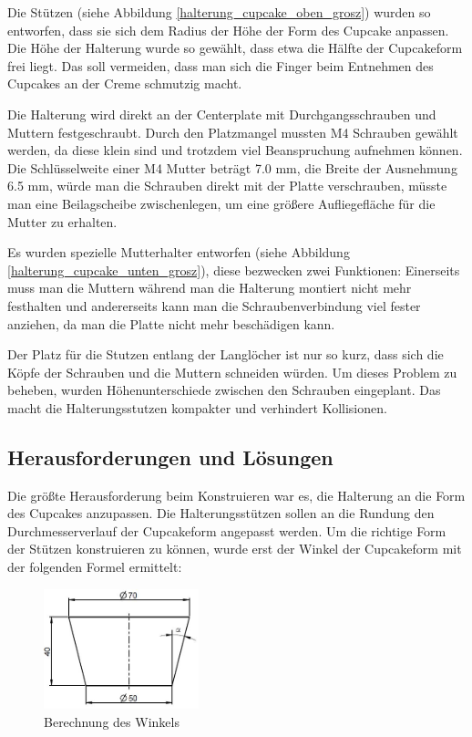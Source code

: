	Die Stützen (siehe Abbildung \ref{halterung_cupcake_oben_grosz}) wurden so entworfen, dass sie sich dem Radius \bzw der Höhe der Form des Cupcake anpassen.
	Die Höhe der Halterung wurde so gewählt, dass etwa die Hälfte der Cupcakeform frei liegt.
	Das soll vermeiden, dass man sich die Finger beim Entnehmen des Cupcakes an der Creme schmutzig macht.

	Die Halterung wird direkt an der Centerplate mit Durchgangsschrauben und Muttern festgeschraubt.
	Durch den Platzmangel mussten M4 Schrauben gewählt werden, da diese klein sind und trotzdem viel Beanspruchung aufnehmen können.
	Die Schlüsselweite einer M4 Mutter beträgt 7.0 mm, die Breite der Ausnehmung 6.5 mm, würde man die Schrauben direkt mit der Platte verschrauben, müsste man eine Beilagscheibe zwischenlegen, um eine größere Aufliegefläche für die Mutter zu erhalten.

	Es wurden spezielle Mutterhalter entworfen (siehe Abbildung \ref{halterung_cupcake_unten_grosz}), diese bezwecken zwei Funktionen:
	Einerseits muss man die Muttern während man die Halterung montiert nicht mehr festhalten und andererseits kann man die Schraubenverbindung viel fester anziehen, da man die Platte nicht mehr beschädigen kann.

	Der Platz für die Stutzen entlang der Langlöcher ist nur so kurz, dass sich die Köpfe der Schrauben und die Muttern schneiden würden.
	Um dieses Problem zu beheben, wurden Höhenunterschiede zwischen den Schrauben eingeplant.
	Das macht die Halterungsstutzen kompakter und verhindert Kollisionen.

		\newpage

	\subsection{Herausforderungen und Lösungen}

	Die größte Herausforderung beim Konstruieren war es, die Halterung an die Form des Cupcakes anzupassen.
	Die Halterungsstützen sollen an die Rundung \bzw den Durchmesserverlauf der Cupcakeform angepasst werden.
	Um die richtige Form der Stützen konstruieren zu können, wurde erst der Winkel der Cupcakeform mit der  folgenden Formel ermittelt:

			\begin{figure}[tbh]
			\begin{centering}
			\includegraphics[width = 0.4\textwidth]{Bilder/berechnung_winkel}
			\par\end{centering}
			\caption{Berechnung des Winkels}
			\label{berechnung_winkel}
			\end{figure}

